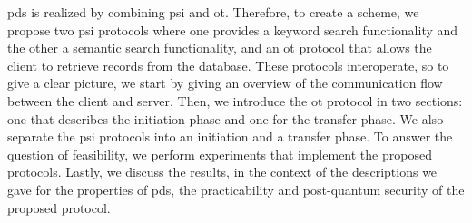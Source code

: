 \acrshort{pds} is realized by combining \acrshort{psi} and \acrshort{ot}. Therefore, to create a scheme, we propose two \acrshort{psi} protocols where one provides a keyword search functionality and the other a semantic search functionality, and an \acrshort{ot} protocol that allows the client to retrieve records from the database. These protocols interoperate, so to give a clear picture, we start by giving an overview of the communication flow between the client and server. Then, we introduce the \acrshort{ot} protocol in two sections: one that describes the initiation phase and one for the transfer phase. We also separate the \acrshort{psi} protocols into an initiation and a transfer phase. To answer the question of feasibility, we perform experiments that implement the proposed protocols. Lastly, we discuss the results, in the context of the descriptions we gave for the properties of \acrshort{pds}, the practicability and post-quantum security of the proposed protocol.